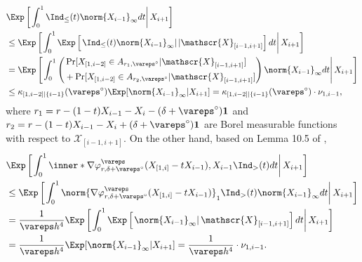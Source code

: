 \documentclass[aos]{imsart}
\begin{document}
\begin{appendix}
\begin{equation*}
\begin{aligned}
    & \Exp\left[ \left. \int_0^1 
        \Ind_\leq(t)
        \norm{X_{i-1}}_\infty 
    dt \right| X_{i+1} \right] \\
    & \leq \Exp\left[ \left. \int_0^1 \Exp\left[ \left. 
        \Ind_\leq(t)
        \norm{X_{i-1}}_\infty \right| | \mathscr{X}_{[i-1, i+1]} \right] 
    dt \right| X_{i+1} \right] \\
    & = \Exp\left[ \left. \int_0^1 \left(
    \begin{aligned}
        & \Pr[X_{[1,i-2]} \in A_{r_1, \vareps^\circ} | \mathscr{X}_{[i-1, i+1]}] \\
        & + \Pr[X_{[1,i-2]} \in A_{r_2, \vareps^\circ} | \mathscr{X}_{[i-1, i+1]}]
    \end{aligned} \right)
    \norm{X_{i-1}}_\infty dt \right| X_{i+1} \right] \\
    & \leq \kappa_{[1,i-2]|\{i-1\}}(\vareps^\circ)
    \Exp[\norm{X_{i-1}}_\infty | X_{i+1}] 
    = \kappa_{[1,i-2]|\{i-1\}}(\vareps^\circ) \cdot \nu_{1,i-1},
\end{aligned}
\end{equation*}
where $r_1 = r - (1-t) X_{i-1} - X_{i} - (\delta+\vareps^\circ)\mathbf{1}$ and $r_2 = r - (1-t) X_{i-1} - X_{i} + (\delta+\vareps^\circ)\mathbf{1}$ are Borel measurable functions with respect to $\mathscr{X}_{[i-1, i+1]}$. On the other hand, based on Lemma 10.5 of \citet{lopes2022central},
\begin{equation*}
\begin{aligned}
    &\Exp\left[ \left. \int_0^1 \inner*{
            \nabla \varphi_{r,\delta+\vareps^\circ}^\vareps(X_{[1,i]} - t X_{i-1}),
            X_{i-1}
        } \Ind_>(t) 
    dt \right| X_{i+1} \right] \\
    & \leq \Exp\left[ \left. \int_0^1 
        \norm{\nabla \varphi_{r,\delta+\vareps^\circ}^\vareps(X_{[1,i]} - t X_{i-1})}_1 \Ind_>(t)
        \norm{X_{i-1}}_\infty 
    dt \right| X_{i+1} \right] \\
    & = \frac{1}{\vareps h^4} \Exp\left[ \left. \int_0^1 \Exp\left[ \left. 
        \norm{X_{i-1}}_\infty \right| \mathscr{X}_{[i-1, i+1]} \right] 
    dt \right| X_{i+1} \right] \\
    & = \frac{1}{\vareps h^4} \Exp[\norm{X_{i-1}}_\infty | X_{i+1}] 
    = \frac{1}{\vareps h^4} \cdot \nu_{1,i-1}.
\end{aligned}

\end{equation*}
\end{appendix}
\end{document}
